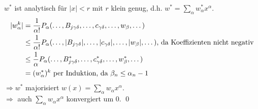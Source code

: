 \begin{enumerate}[(1)]
\begin{itemize}
\begin{itemize}
					 $w^*$ ist analytisch für $|x|<r$ mit $r$ klein genug, d.h. $w^*  =\sum\limits_{\alpha} w_\alpha^* x^\alpha$.
					 \begin{equation}
					 \begin{aligned}
					 	|w_\alpha^k| &= \frac{1}{\alpha!} P_\alpha(\dots,B_{j\gamma\delta},\dots,c_{\gamma\delta},\dots,w_\beta,\dots) \\ \notag
					 	&\leq \frac{1}{\alpha!}  P_\alpha(\dots,|B_{j\gamma\delta}|,\dots,|c_{\gamma\delta}|,\dots,|w_\beta|,\dots) \text{, da Koeffizienten nicht negativ} \\
					 	&\leq \frac{1}{\alpha} P_\alpha (\dots,B_{j\gamma\delta}^*, \dots, c_{\gamma \delta}^*,\dots, w_\beta^*,\dots) \\
					 	&= (w_\alpha^*)^k \text{ per Induktion, da } \beta_n \leq \alpha_n - 1
					 \end{aligned}
					 \end{equation}
					 $\Rightarrow w^*$ majorisiert $w(x) = \sum_{\alpha} w_\alpha x^\alpha$. \\
					 $\Rightarrow$ auch $\sum\limits_{\alpha} w_\alpha x^\alpha$ konvergiert um 0. \qed
				\end{itemize}
		\end{itemize}
	\end{enumerate}
	
